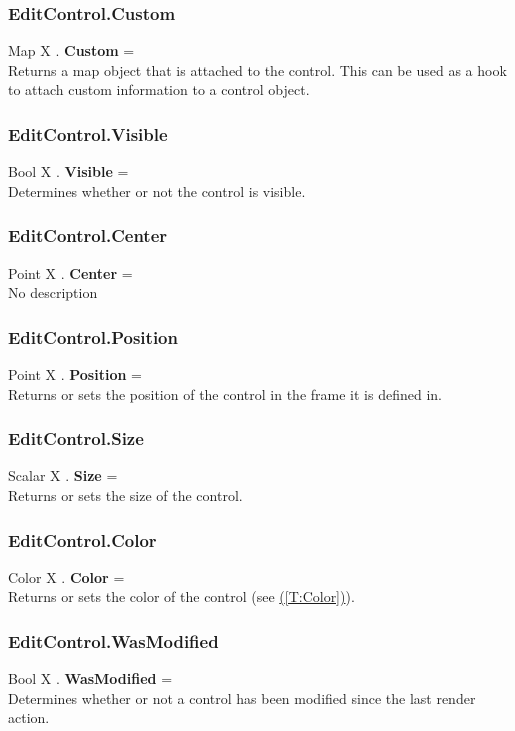 \documentclass[10pt]{book}
\newcommand{\linkitem}[1]{\hyperref[#1]{\nameref{#1} (\ref{#1})}}
\begin{document}
\subsubsection{EditControl.Custom \label{F:EditControl:Custom}}
Map X . \textbf{Custom} = \\
Returns a map object that is attached to the control. This can be used as a hook to attach custom information to a control object.

\subsubsection{EditControl.Visible \label{F:EditControl:Visible}}
Bool X . \textbf{Visible} = \\
Determines whether or not the control is visible.

\subsubsection{EditControl.Center \label{F:EditControl:Center}}
Point X . \textbf{Center} = \\
No description

\subsubsection{EditControl.Position \label{F:EditControl:Position}}
Point X . \textbf{Position} = \\
Returns or sets the position of the control in the frame it is defined in.

\subsubsection{EditControl.Size \label{F:EditControl:Size}}
Scalar X . \textbf{Size} = \\
Returns or sets the size of the control.

\subsubsection{EditControl.Color \label{F:EditControl:Color}}
Color X . \textbf{Color} = \\
Returns or sets the color of the control (see \linkitem{T:Color}).

\subsubsection{EditControl.WasModified \label{F:EditControl:WasModified}}
Bool X . \textbf{WasModified} = \\
Determines whether or not a control has been modified since the last render action.
\end{document}
